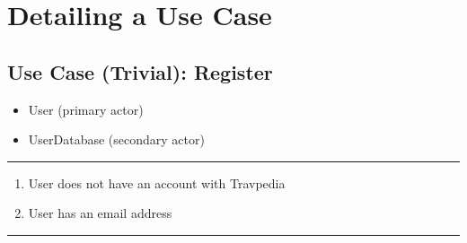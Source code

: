 \tablewidth

\hspace{-4.2cm}
\begin{minipage}[h][][s]{\linewidth}
	\section{Detailing a Use Case}
	\subsection{Use Case (Trivial): Register}
\end{minipage}

\begin{itemize}
	\item User (primary actor)
	\item UserDatabase (secondary actor)
\end{itemize}
\noindent\rule{\textwidth}{0.6pt}

\begin{enumerate}
	\item User does not have an account with Travpedia
	\item User has an email address
\end{enumerate}
\noindent\rule{\textwidth}{0.6pt}

